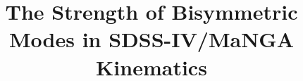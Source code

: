 \usepackage{amsmath}
\usepackage{amssymb}
\usepackage{graphicx}
\usepackage{bm}



%

\newcommand{\note}[2][todo]{{\color{#1}[[{\bf #2}]]}}

\received{}
\revised{}
\accepted{}






\title{The Strength of Bisymmetric Modes in SDSS-IV/MaNGA Kinematics}

